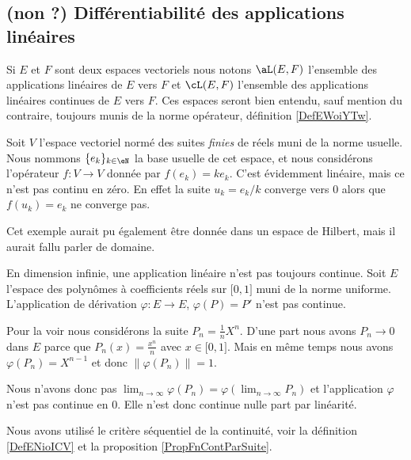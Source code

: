 \subsection{(non ?) Différentiabilité des applications linéaires}

Si \( E\) et \( F\) sont deux espaces vectoriels nous notons \( \aL(E,F)\) l'ensemble des applications linéaires de \( E\) vers \( F\) et \( \cL(E,F)\) l'ensemble des applications linéaires continues de \( E\) vers \( F\). Ces espaces seront bien entendu, sauf mention du contraire, toujours munis de la norme opérateur, définition \ref{DefEWoiYTw}.

\begin{example}  \label{ExHKsIelG}
    Soit \( V\) l'espace vectoriel normé des suites \emph{finies} de réels muni de la norme usuelle. Nous nommons \( \{ e_k \}_{k\in \eN}\) la base usuelle de cet espace, et nous considérons l'opérateur \( f\colon V\to V\) donnée par \( f(e_k)=ke_k\). C'est évidemment linéaire, mais ce n'est pas continu en zéro. En effet la suite \( u_k=e_k/k\) converge vers \( 0\) alors que \( f(u_k)=e_k\) ne converge pas.
\end{example}
Cet exemple aurait pu également être donnée dans un espace de Hilbert, mais il aurait fallu parler de domaine.


\begin{example}
    En dimension infinie, une application linéaire n'est pas toujours continue. Soit \( E\) l'espace des polynômes à coefficients réels sur \( \mathopen[ 0 , 1 \mathclose]\) muni de la norme uniforme. L'application de dérivation \( \varphi\colon E\to E\), \( \varphi(P)=P'\) n'est pas continue.

    Pour la voir nous considérons la suite \( P_n=\frac{1}{ n }X^n\). D'une part nous avons \( P_n\to 0\) dans \( E\) parce que \( P_n(x)=\frac{ x^n }{ n }\) avec \( x\in \mathopen[ 0 , 1 \mathclose]\). Mais en même temps nous avons \( \varphi(P_n)=X^{n-1}\) et donc \( \| \varphi(P_n) \|=1\).

    Nous n'avons donc pas \( \lim_{n\to \infty} \varphi(P_n)=\varphi(\lim_{n\to \infty} P_n)\) et l'application \( \varphi\) n'est pas continue en \( 0\). Elle n'est donc continue nulle part par linéarité.

    Nous avons utilisé le critère séquentiel de la continuité, voir la définition \ref{DefENioICV} et la proposition \ref{PropFnContParSuite}.
\end{example}

